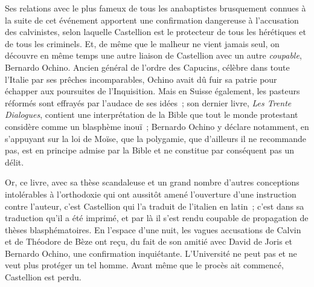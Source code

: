 \documentclass[french,twoside]{book} %
\newcommand{\astermono}{\medskip\centerline{\color{rubric}\large\selectfont{\syms ✻}}\medskip\par}%
\begin{document}
Ses relations avec le plus fameux de tous les anabaptistes brusquement connues à la suite de cet événement apportent une confirmation dangereuse à l’accusation des calvinistes, selon laquelle Castellion est le protecteur de tous les hérétiques et de tous les criminels. Et, de même que le malheur ne vient jamais seul, on découvre en même temps une autre liaison de Castellion avec un autre \emph{coupable}, Bernardo Ochino. Ancien général de l’ordre des Capucins, célèbre dans toute l’Italie par ses prêches incomparables, Ochino avait dû fuir sa patrie pour échapper aux poursuites de l’Inquisition. Mais en Suisse également, les pasteurs réformés sont effrayés par l’audace de ses idées ; son dernier livre, \emph{Les Trente Dialogues}, contient une interprétation de la Bible que tout le monde protestant considère comme un blasphème inouï ; Bernardo Ochino y déclare notamment, en s’appuyant sur la loi de Moïse, que la polygamie, que d’ailleurs il ne recommande pas, est en principe admise par la Bible et ne constitue par conséquent pas un délit.\par
Or, ce livre, avec sa thèse scandaleuse et un grand nombre d’autres conceptions intolérables à l’orthodoxie qui ont aussitôt amené l’ouverture d’une instruction contre l’auteur, c’est Castellion qui l’a traduit de l’italien en latin ; c’est dans sa traduction qu’il a été imprimé, et par là il s’est rendu coupable de propagation de thèses blasphématoires. En l’espace d’une nuit, les vagues accusations de Calvin et de Théodore de Bèze ont reçu, du fait de son amitié avec David de Joris et Bernardo Ochino, une confirmation inquiétante. L’Université ne peut pas et ne veut plus protéger un tel homme. Avant même que le procès ait commencé, Castellion est perdu.\par

\astermono
\end{document}
